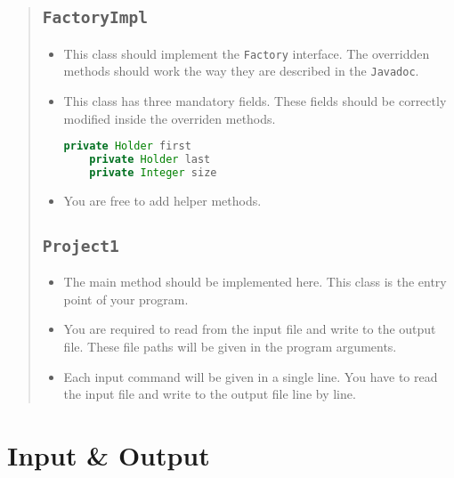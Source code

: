\documentclass[10pt]{article}
\begin{document}
\begin{quote}
    
\subsection{\Large\textbf{\texttt{FactoryImpl}}}
    \begin{itemize}
    
    \item This class should implement the \texttt{Factory} interface. The overridden methods should work the way they are described in the \texttt{Javadoc}.
    
    \item This class has three mandatory fields. These fields should be correctly modified inside the overriden methods. 
    
\begin{lstlisting}[language=Java]
    private Holder first
    private Holder last
    private Integer size
\end{lstlisting}

    \item You are free to add helper methods.
    
    \end{itemize}

\subsection{\Large\textbf{\texttt{Project1}}}
    \begin{itemize}

    \item The main method should be implemented here. This class is the entry point of your program. 
    
    \item You are required to read from the input file and write to the output file. These file paths will be given in the program arguments.
    
    \item Each input command will be given in a single line. You have to read the input file and write to the output file line by line.

    \end{itemize}
    
\end{quote}

\goodbreak
\section{Input \& Output}
\end{document}
